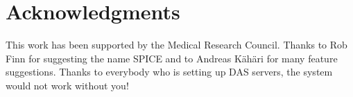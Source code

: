 \documentclass{bioinfo}
\begin{document}
\section{Acknowledgments}

This work has been supported by the Medical Research Council.
Thanks to Rob Finn for suggesting the name SPICE and to Andreas K\"ah\"ari for
many feature suggestions. Thanks to everybody who is setting up DAS servers,
the system would not work without you!


\end{document}
